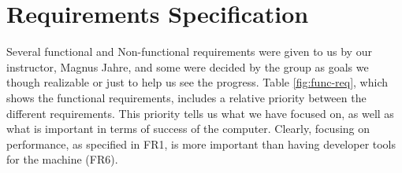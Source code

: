 \section{Requirements Specification}
\begin{comment}

Creating a computer without specifying functional requirements would make it
difficult to both see how well we are progressing and to figure out if we've
actually reached our goal in the end. Non-functional requirements are important
to realize the computer: Both price and components were set by the assignment as
non-functional requirements. As such, both functional and non-functional
requirements were written down to give ourselves clear goals and
specifications. 



Table \ref{fig:func-req}, which shows the functional requirements includes a
relative priority between the different requirements. This priority tells us
what we have focused on, as well as what is important in terms of success of the
computer. Clearly, focusing on performance, as specified in {\sc FR1}, is more
important than having developer tools for the machine ({\sc FR6}).
\CHECK{Ensure FR numbers are correct.}

{\sc FR1} ensure the focus on performance. {\sc FR2} ensures that we do not end
up with a system which is not generally programmable. This is important, as a
computer specialized for image processing has less usability than a generally
programmable computer. {\sc FR3} and {\sc FR7} makes it easier to show that the
computer is capable of processing images, whereas {\sc FR4 - FR6} makes it
easier to use, debug and create programs for the computer.
\end{comment}

Several functional and Non-functional requirements were given to us by our
instructor, Magnus Jahre, and some were decided by the group as goals we
though realizable or just to help us see the progress. Table \ref{fig:func-req}, which shows the functional
requirements, includes a relative priority between the different requirements.
This priority tells us what we have focused on, as well as what is important in
terms of success of the computer. Clearly, focusing on performance, as
specified in {\sc FR1}, is more important than having developer tools for the machine ({\sc FR6}).

